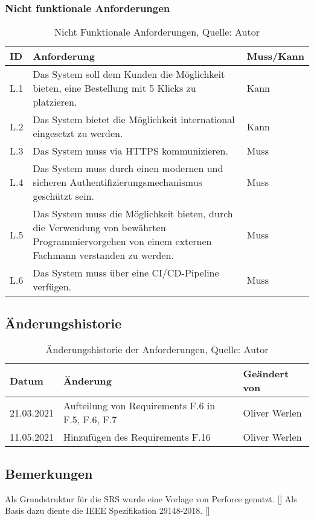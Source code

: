 \subsubsection{Nicht funktionale Anforderungen}
\begin{table}[H]
	\setlength\extrarowheight{2pt} %
	\begin{tabularx}{\textwidth}{|l|X|l|}
		\hline
		\textbf{ID} &  \textbf{Anforderung} & \textbf{Muss/Kann}  \\
        \hline
		L.1 & Das System soll dem Kunden die Möglichkeit bieten, eine Bestellung mit 5 Klicks zu platzieren.  & Kann \\
		\hline
		L.2 & Das System bietet die Möglichkeit international eingesetzt zu werden. & Kann \\
		\hline
		L.3 & Das System muss via HTTPS kommunizieren. & Muss \\
		\hline
		L.4 & Das System muss durch einen modernen und sicheren Authentifizierungsmechanismus geschützt sein. & Muss \\
		\hline
		L.5 & Das System muss die Möglichkeit bieten, durch die Verwendung von bewährten Programmiervorgehen von einem externen Fachmann verstanden zu werden. & Muss \\
		\hline
		L.6 & Das System muss über eine CI/CD-Pipeline verfügen. & Muss \\ 
		\hline
	\end{tabularx}
	\caption{ \label{tbl: NichtFunktionaleAnforderungent}Nicht Funktionale Anforderungen, Quelle: Autor}
\end{table}
\subsection{Änderungshistorie}
\begin{table}[H]
	\setlength\extrarowheight{2pt} %
	\begin{tabularx}{\textwidth}{|l|X|l|}
		\hline
		\textbf{Datum} &  \textbf{Änderung} & \textbf{Geändert von} \\
		\hline
		21.03.2021 & Aufteilung von Requirements F.6 in F.5, F.6, F.7  & Oliver Werlen \\
		\hline
		11.05.2021 & Hinzufügen des Requirements F.16  & Oliver Werlen \\
		\hline
	\end{tabularx}
	\caption{ \label{tbl: historieAnforderungen}Änderungshistorie der Anforderungen, Quelle: Autor}
\end{table}
\subsection{Bemerkungen}
Als Grundstruktur für die SRS wurde eine Vorlage von Perforce genutzt. [\cite{srsdocument}]
Als Basis dazu diente die IEEE Spezifikation 29148-2018. [\cite{ieeeSrs}]
\newpage
